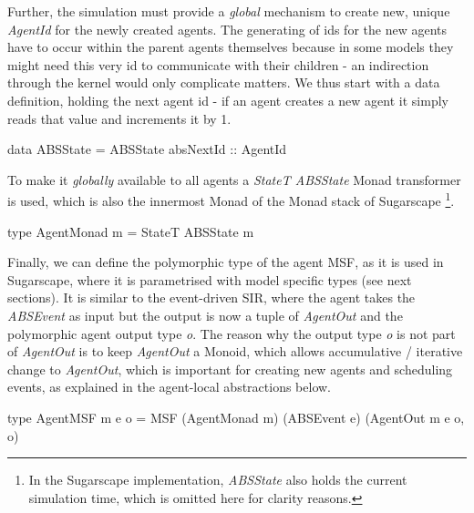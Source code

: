 Further, the simulation must provide a \textit{global} mechanism to create new, unique \textit{AgentId} for the newly created agents. The generating of ids for the new agents have to occur within the parent agents themselves because in some models they might need this very id to communicate with their children - an indirection through the kernel would only complicate matters. We thus start with a data definition, holding the next agent id - if an agent creates a new agent it simply reads that value and increments it by 1.

\begin{HaskellCode}
data ABSState = ABSState { absNextId :: AgentId }
\end{HaskellCode}

To make it \textit{globally} available to all agents a \textit{StateT ABSState} Monad transformer is used, which is also the innermost Monad of the Monad stack of Sugarscape \footnote{In the Sugarscape implementation, \textit{ABSState} also holds the current simulation time, which is omitted here for clarity reasons.}.

\begin{HaskellCode}
type AgentMonad m = StateT ABSState m
\end{HaskellCode}

Finally, we can define the polymorphic type of the agent MSF, as it is used in Sugarscape, where it is parametrised with model specific types (see next sections). It is similar to the event-driven SIR, where the agent takes the \textit{ABSEvent} as input but the output is now a tuple of \textit{AgentOut} and the polymorphic agent output type \textit{o}. The reason why the output type \textit{o} is not part of \textit{AgentOut} is to keep \textit{AgentOut} a Monoid, which allows accumulative / iterative change to \textit{AgentOut}, which is important for creating new agents and scheduling events, as explained in the agent-local abstractions below.

\begin{HaskellCode}
type AgentMSF m e o = MSF (AgentMonad m) (ABSEvent e) (AgentOut m e o, o)
\end{HaskellCode}